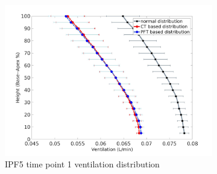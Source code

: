 \begin{figure}[htbp]  
\centering
\begin{subfigure}{.6\linewidth}%
  \includegraphics[width=\linewidth,trim={{.0\wd0} {.0\wd0} {.0\wd0} {.0\wd0}},clip]{Appendix/Image_AppexB/IPF511/IPF511_VentilationAgainstLungHeight.jpg} %
  \caption{IPF5 time point 1 ventilation distribution}
  \label{fig:IPF511VQDistribution-a} 
\end{subfigure} 
\begin{subfigure}{.6\linewidth}%

\end{subfigure}
\end{figure}
